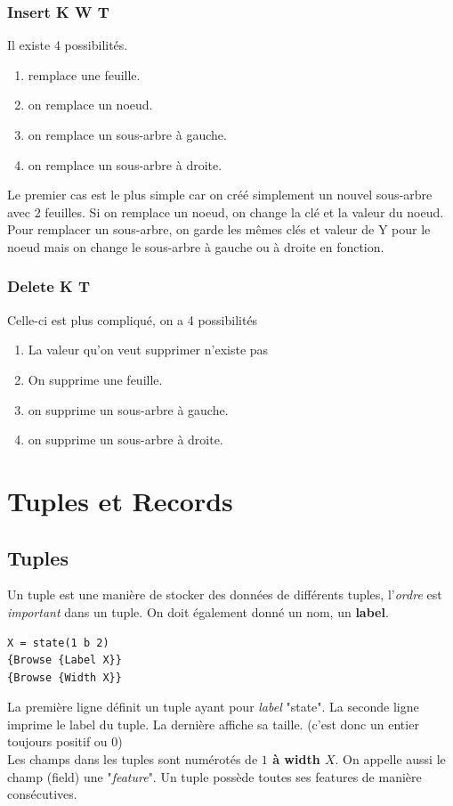 \documentclass{report}
\begin{document}
\subsubsection{Insert K W T}
Il existe 4 possibilités.
\begin{enumerate}
\item remplace une feuille.
\item on remplace un noeud.
\item on remplace un sous-arbre à gauche.
\item on remplace un sous-arbre à droite.
\end{enumerate}
Le premier cas est le plus simple car on créé simplement un nouvel sous-arbre avec 2 feuilles. Si on remplace un noeud, on change la clé et la valeur du noeud.
Pour remplacer un sous-arbre, on garde les mêmes clés et valeur de Y pour le noeud mais on change le sous-arbre à gauche ou à droite en fonction.
\subsubsection{Delete K T}
Celle-ci est plus compliqué, on a 4 possibilités
\begin{enumerate}
\item La valeur qu'on veut supprimer n'existe pas
\item On supprime une feuille.
\item on supprime un sous-arbre à gauche.
\item on supprime un sous-arbre à droite.
\end{enumerate}

\section{Tuples et Records}

\subsection{Tuples}
Un tuple est une manière de stocker des données de différents tuples, l'\textit{ordre} est \textit{important} dans un tuple. On doit également donné un nom, un \textbf{label}.
\begin{lstlisting}
X = state(1 b 2)
{Browse {Label X}}
{Browse {Width X}}
\end{lstlisting}
La première ligne définit un tuple ayant pour \textit{label} "state". La seconde ligne imprime le label du tuple. La dernière affiche sa taille. (c'est donc un entier toujours positif ou $0$)\\
Les champs dans les tuples sont numérotés de\textbf{ $1$ à width $X$}. On appelle aussi le champ (field) une "\textit{feature}". Un tuple possède toutes ses features de manière consécutives.\\
\end{document}

